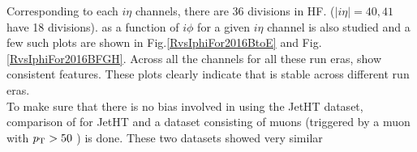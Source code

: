 Corresponding to each $i\eta$ channels, there are 36 divisions in HF. ($|i\eta| = 40,41 $ have 18 divisions). 
\ratiosl as a function of $i\phi$ for a given $i\eta$ channel is also studied and a few such plots are shown
in Fig.\ref{RvsIphiFor2016BtoE} and Fig.\ref{RvsIphiFor2016BFGH}. 
Across all the channels for all these run eras, \ratiosl show consistent features. These plots clearly indicate
that \ratiosl is stable across different run eras.\\
To make sure that there is no bias involved in using the JetHT dataset, comparison of \ratiosl for 
JetHT and a dataset consisting of muons (triggered by a muon with $p_{\mathrm{T}} > 50$ \gev)  is done. 
These two datasets showed very similar \ratiosl %
